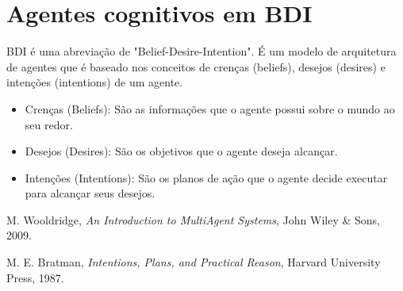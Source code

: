 \documentclass[12pt]{article}
\begin{document}
	\section{Agentes cognitivos em BDI}
	\label{sec:agentes_cog}

    BDI é uma abreviação de "Belief-Desire-Intention". É um modelo de arquitetura de agentes que é baseado nos conceitos de crenças (beliefs), desejos (desires) e intenções (intentions) de um agente.
    \begin{itemize}
    \item Crenças (Beliefs): São as informações que o agente possui sobre o mundo ao seu redor.
    \item Desejos (Desires): São os objetivos que o agente deseja alcançar.
    \item Intenções (Intentions): São os planos de ação que o agente decide executar para alcançar seus desejos.
    \end{itemize}
    
\begin{thebibliography}{9}
M. Wooldridge,
\textit{An Introduction to MultiAgent Systems},
John Wiley \& Sons, 2009.

M. E. Bratman,
\textit{Intentions, Plans, and Practical Reason},
Harvard University Press, 1987.
\end{thebibliography}
\end{document}
